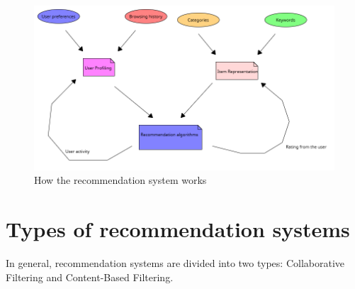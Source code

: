 \documentclass[10pt,twoside,slovak,a4paper]{article}
\begin{document}
 \begin{figure}[!h]
    \centering
    \includegraphics[width=1\linewidth]{Diagram 2.png}
    \caption{How the recommendation system works}
    \label{fig:recommendations}
\end{figure}
 


\newpage
\section{Types of recommendation systems} \label{Types of recommendation systems}

In general, recommendation systems are divided into two types: Collaborative Filtering and Content-Based Filtering\cite{types}.
\end{document}

